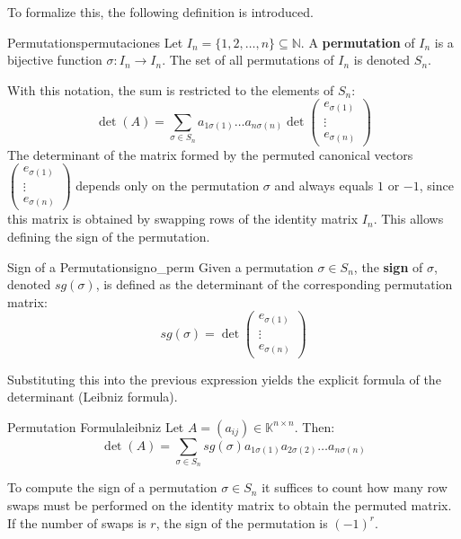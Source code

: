 \documentclass[11pt, a4paper]{article}
\begin{document}
To formalize this, the following definition is introduced.

\begin{definicion}{Permutations}{permutaciones}
Let $I_n = \{1, 2, \dots, n\} \subseteq \mathbb{N}$. A \textbf{permutation} of $I_n$ is a bijective function $\sigma: I_n \to I_n$.
The set of all permutations of $I_n$ is denoted $S_n$.
\end{definicion}

With this notation, the sum is restricted to the elements of $S_n$:
\[
\det(A) = \sum_{\sigma \in S_n} a_{1 \sigma(1)} \dots a_{n \sigma(n)} \det \begin{pmatrix} e_{\sigma(1)} \\ \vdots \\ e_{\sigma(n)} \end{pmatrix}
\]
The determinant of the matrix formed by the permuted canonical vectors $\begin{pmatrix} e_{\sigma(1)} \\ \vdots \\ e_{\sigma(n)} \end{pmatrix}$ depends only on the permutation $\sigma$ and always equals $1$ or $-1$, since this matrix is obtained by swapping rows of the identity matrix $I_n$.
This allows defining the sign of the permutation.

\begin{definicion}{Sign of a Permutation}{signo_perm}
Given a permutation $\sigma \in S_n$, the \textbf{sign} of $\sigma$, denoted $sg(\sigma)$, is defined as the determinant of the corresponding permutation matrix:
\[
sg(\sigma) = \det \begin{pmatrix} e_{\sigma(1)} \\ \vdots \\ e_{\sigma(n)} \end{pmatrix}
\]
\end{definicion}

Substituting this into the previous expression yields the explicit formula of the determinant (Leibniz formula).

\begin{proposicion}{Permutation Formula}{leibniz}
Let $A = (a_{ij}) \in \mathbb{K}^{n \times n}$. Then:
\[
\det(A) = \sum_{\sigma \in S_n} sg(\sigma) a_{1 \sigma(1)} a_{2 \sigma(2)} \dots a_{n \sigma(n)}
\]
\end{proposicion}

\obs To compute the sign of a permutation $\sigma \in S_n$ it suffices to count how many row swaps must be performed on the identity matrix to obtain the permuted matrix.
If the number of swaps is $r$, the sign of the permutation is $(-1)^r$.
\end{document}
